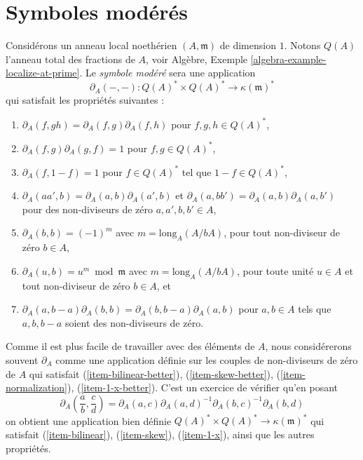 \section{Symboles modérés}
\label{section-tame-symbol}

\noindent
Considérons un anneau local noethérien $(A, \mathfrak m)$ de dimension $1$.
Notons $Q(A)$ l'anneau total des fractions de $A$, voir
Algèbre, Exemple \ref{algebra-example-localize-at-prime}.
Le {\it symbole modéré} sera une application
$$
\partial_A(-, -) : Q(A)^* \times Q(A)^* \longrightarrow \kappa(\mathfrak m)^*
$$
qui satisfait les propriétés suivantes :
\begin{enumerate}
\item $\partial_A(f, gh) = \partial_A(f, g) \partial_A(f, h)$
\label{item-bilinear}
pour $f, g, h \in Q(A)^*$,
\item $\partial_A(f, g) \partial_A(g, f) = 1$
\label{item-skew}
pour $f, g \in Q(A)^*$,
\item $\partial_A(f, 1 - f) = 1$
\label{item-1-x}
pour $f \in Q(A)^*$ tel que $1 - f \in Q(A)^*$,
\item $\partial_A(aa', b) = \partial_A(a, b)\partial_A(a', b)$
\label{item-bilinear-better}
et $\partial_A(a, bb') = \partial_A(a, b)\partial_A(a, b')$
pour des non-diviseurs de zéro $a, a', b, b' \in A$,
\item $\partial_A(b, b) = (-1)^m$
\label{item-skew-better}
avec $m = \text{long}_A(A/bA)$,
pour tout non-diviseur de zéro $b \in A$,
\item $\partial_A(u, b) = u^m \bmod \mathfrak m$
\label{item-normalization}
avec $m = \text{long}_A(A/bA)$, pour toute unité $u \in A$ et tout
non-diviseur de zéro $b \in A$, et
\item
\label{item-1-x-better}
$\partial_A(a, b - a)\partial_A(b, b) = \partial_A(b, b - a)\partial_A(a, b)$
pour $a, b \in A$ tels que $a, b, b - a$ soient des non-diviseurs de zéro.
\end{enumerate}
Comme il est plus facile de travailler avec des éléments de $A$, nous
considérerons souvent $\partial_A$ comme une application définie sur les couples de
non-diviseurs de zéro de $A$ qui satisfait (\ref{item-bilinear-better}),
(\ref{item-skew-better}), (\ref{item-normalization}),
(\ref{item-1-x-better}). C'est un exercice de vérifier qu'en
posant
$$
\partial_A(\frac{a}{b}, \frac{c}{d}) =
\partial_A(a, c) \partial_A(a, d)^{-1} \partial_A(b, c)^{-1} \partial_A(b, d)
$$
on obtient une application bien définie $Q(A)^* \times Q(A)^* \to \kappa(\mathfrak m)^*$
qui satisfait (\ref{item-bilinear}), (\ref{item-skew}), (\ref{item-1-x}),
ainsi que les autres propriétés.

